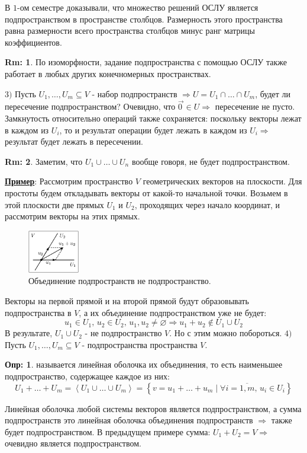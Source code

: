 \documentclass[12pt]{article}
\newcommand{\VN}{\varnothing}
\theoremstyle{definition}
\newtheorem{defn}{Опр:}
\newtheorem{rem}{Rm:}
\newcommand{\linsp}[1]{\left\langle #1 \right\rangle }
\newcommand{\vecm}[1]{\overrightarrow{#1\,}}
\begin{document}
В $1$-ом семестре доказывали, что множество решений ОСЛУ является подпространством в пространстве столбцов. Размерность этого пространства равна размерности всего пространства столбцов минус ранг матрицы коэффициентов.

\begin{rem}
	По изоморфности, задание подпространства с помощью ОСЛУ также работает в любых других конечномерных пространствах.
\end{rem}

$3)$ Пусть $U_1, \dotsc, U_m \subseteq V$ - набор подпространств $\Rightarrow U = U_1 \cap \dotsc \cap U_m$, будет ли пересечение подпространством? Очевидно, что $\vecm{0}\in U \Rightarrow$ пересечение не пусто. Замкнутость относительно операций также сохраняется: поскольку векторы лежат в каждом из $U_i$, то и результат операции будет лежать в каждом из $U_i \Rightarrow$ результат будет лежать в пересечении. 

\begin{rem}
	Заметим, что $U_1 \cup \dotsc \cup U_n$ вообще говоря, не будет подпространством.
\end{rem}

\textbf{\uline{Пример}}: Рассмотрим пространство $V$ геометрических векторов на плоскости. Для простоты будем откладывать векторы от какой-то начальной точки. Возьмем в этой плоскости две прямых $U_1$ и $U_2$, проходящих через начало координат, и рассмотрим векторы на этих прямых. 
\begin{figure}[H]
	\centering
	\includegraphics[width=0.2\textwidth]{LAL2_2.eps}
	\caption{Объединение подпространств не подпространство.}
	\label{2_2}
\end{figure}
Векторы на первой прямой и на второй прямой будут образовывать подпространства в $V$, а их объединение подпространством уже не будет: 
$$
	u_1 \in U_1, \, u_2 \in U_2, \, u_1,u_2 \neq \VN \Rightarrow u_1 + u_2 \not\in U_1 \cup U_2
$$
В результате, $U_1 \cup U_2$ - не подпространство $V$. Но с этим можно побороться.
\newpage
$4)$ Пусть $U_1,\dotsc, U_m \subseteq V$ - подпространства пространства $V$.
\begin{defn}
	 называется линейная оболочка их объединения, то есть наименьшее подпространство, содержащее каждое из них:
	$$
		U_1 + \dotsc + U_m = \linsp{U_1 \cup \dotsc \cup U_m} = \left\{v = u_1 + \dotsc + u_m\mid \forall i = \overline{1,m}, \, u_i \in U_i\right\}
	$$
\end{defn}
Линейная оболочка любой системы векторов является подпространством, а сумма подпространств это линейная оболочка объединения подпространств $\Rightarrow$ также будет подпространством.
В предыдущем примере сумма: $U_1 + U_2 = V \Rightarrow$ очевидно является подпространством.
\end{document}

